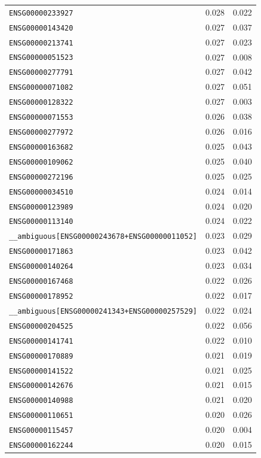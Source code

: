 \begin{longtable}{lcc}
\texttt{ENSG00000233927} & 0.028 & 0.022 \\
\texttt{ENSG00000143420} & 0.027 & 0.037 \\
\texttt{ENSG00000213741} & 0.027 & 0.023 \\
\texttt{ENSG00000051523} & 0.027 & 0.008 \\
\texttt{ENSG00000277791} & 0.027 & 0.042 \\
\texttt{ENSG00000071082} & 0.027 & 0.051 \\
\texttt{ENSG00000128322} & 0.027 & 0.003 \\
\texttt{ENSG00000071553} & 0.026 & 0.038 \\
\texttt{ENSG00000277972} & 0.026 & 0.016 \\
\texttt{ENSG00000163682} & 0.025 & 0.043 \\
\texttt{ENSG00000109062} & 0.025 & 0.040 \\
\texttt{ENSG00000272196} & 0.025 & 0.025 \\
\texttt{ENSG00000034510} & 0.024 & 0.014 \\
\texttt{ENSG00000123989} & 0.024 & 0.020 \\
\texttt{ENSG00000113140} & 0.024 & 0.022 \\
\texttt{\_\_ambiguous[ENSG00000243678+ENSG00000011052]} & 0.023 & 0.029 \\
\texttt{ENSG00000171863} & 0.023 & 0.042 \\
\texttt{ENSG00000140264} & 0.023 & 0.034 \\
\texttt{ENSG00000167468} & 0.022 & 0.026 \\
\texttt{ENSG00000178952} & 0.022 & 0.017 \\
\texttt{\_\_ambiguous[ENSG00000241343+ENSG00000257529]} & 0.022 & 0.024 \\
\texttt{ENSG00000204525} & 0.022 & 0.056 \\
\texttt{ENSG00000141741} & 0.022 & 0.010 \\
\texttt{ENSG00000170889} & 0.021 & 0.019 \\
\texttt{ENSG00000141522} & 0.021 & 0.025 \\
\texttt{ENSG00000142676} & 0.021 & 0.015 \\
\texttt{ENSG00000140988} & 0.021 & 0.020 \\
\texttt{ENSG00000110651} & 0.020 & 0.026 \\
\texttt{ENSG00000115457} & 0.020 & 0.004 \\
\texttt{ENSG00000162244} & 0.020 & 0.015 \\
\bottomrule
\end{longtable}
